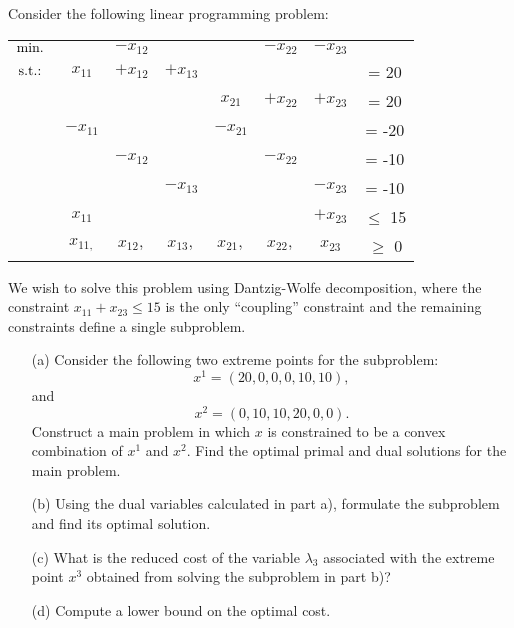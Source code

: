 Consider the following linear programming problem:

\begin{center}
\begin{tabular}{cccccccc}
	 $\mathop{\text{min.~}}	$ 	&   		& $-x_{12}$	& 		& 		& $-x_{22}$	& $-x_{23}$	& 		\\
 	 $\mathop{\text{s.t.:~}} $		& $x_{11}$ 	& $+x_{12}$& $+x_{13}$&		&		&		& = 20   	\\
	 		&		&		&		& $x_{21}$	& $+x_{22}$& $+x_{23}$& = 20   	\\
	 		& $-x_{11}$ 	&		&		& $-x_{21}$	&		& 		& = -20   	\\
			& 		& $-x_{12}$	&		&		& $-x_{22}$	&		& = -10   	\\
			&		&		& $-x_{13}$	&		&		& $-x_{23}$	& = -10   	\\
			& $x_{11}$ 	&		&		& 		& 		& $+x_{23}$& $\le$ 15   	\\
			& $x_{11,}$ 	& $x_{12},$	& $x_{13},$	& $x_{21},$	& $x_{22},$	& $x_{23}$	& $\ge$ 0   	\\
\end{tabular}	
\end{center}

We wish to solve this problem using Dantzig-Wolfe decomposition, where the constraint $x_{11}+x_{23} \le 15$ is the only ``coupling'' constraint and the remaining constraints define a single subproblem.

\begin{itemize}
	\item[(a)] Consider the following two extreme points for the subproblem:
	\begin{equation*}
		x^1 = (20,0,0,0,10,10),		
	\end{equation*}
	and
	\begin{equation*}
		x^2 = (0,10,10,20,0,0).		
	\end{equation*}
	Construct a main problem in which $x$ is constrained to be a convex combination of $x^1$ and $x^2$. Find the optimal primal and dual solutions for the main problem.
	
	\item[(b)] Using the dual variables calculated in part a), formulate the subproblem and find its optimal solution.
	
	\item[(c)] What is the reduced cost of the variable $\lambda_3$ associated with the extreme point $x^3$ obtained from solving the subproblem in part b)?
	
	\item[(d)] Compute a lower bound on the optimal cost.  
	
\end{itemize}


